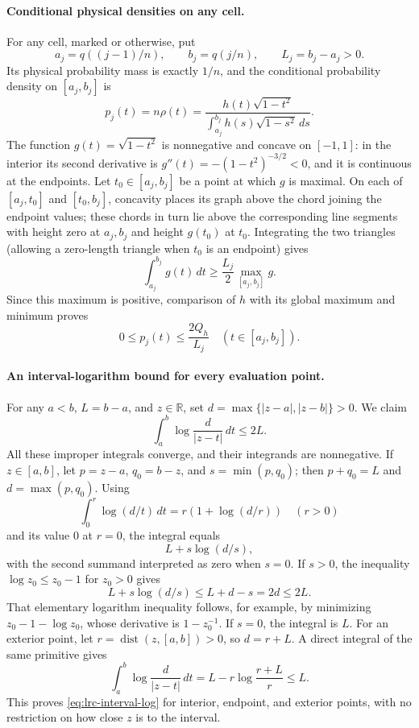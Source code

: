 \documentclass[11pt,a4paper]{article}
\begin{document}
\paragraph{Conditional physical densities on any cell.}
For any cell, marked or otherwise, put
\[
 a_j=q((j-1)/n),\qquad b_j=q(j/n),\qquad L_j=b_j-a_j>0.
\]
Its physical probability mass is exactly $1/n$, and the conditional
probability density on $[a_j,b_j]$ is
\[
 p_j(t)=n\rho(t)
       =\frac{h(t)\sqrt{1-t^2}}
               {\int_{a_j}^{b_j}h(s)\sqrt{1-s^2}\,ds}.
\]
The function $g(t)=\sqrt{1-t^2}$ is nonnegative and concave on
$[-1,1]$: in the interior its second derivative is
$g''(t)=-(1-t^2)^{-3/2}<0$, and it is continuous at the endpoints.
Let $t_0\in[a_j,b_j]$ be a point at which $g$ is maximal.
On each of $[a_j,t_0]$ and $[t_0,b_j]$, concavity places its graph
above the chord joining the endpoint values; these chords in turn
lie above the corresponding line segments with height zero at
$a_j,b_j$ and height $g(t_0)$ at $t_0$. Integrating the two triangles
(allowing a zero-length triangle when $t_0$ is an endpoint) gives
\[
 \int_{a_j}^{b_j}g(t)\,dt\geq\frac{L_j}2\max_{[a_j,b_j]}g.
\]
Since this maximum is positive, comparison of $h$ with its global
maximum and minimum proves
\begin{equation}\label{eq:lrc-cell-density}
 0\leq p_j(t)\leq\frac{2Q_h}{L_j}
 \quad(t\in[a_j,b_j]).
\end{equation}

\paragraph{An interval-logarithm bound for every evaluation point.}
For any $a<b$, $L=b-a$, and $z\in\mathbb R$, set
$d=\max\{|z-a|,|z-b|\}>0$. We claim
\begin{equation}\label{eq:lrc-interval-log}
 \int_a^b\log\frac d{|z-t|}\,dt\leq2L.
\end{equation}
All these improper integrals converge, and their integrands are
nonnegative. If $z\in[a,b]$, let $p=z-a$, $q_0=b-z$, and
$s=\min(p,q_0)$; then $p+q_0=L$ and $d=\max(p,q_0)$.
Using
\[
 \int_0^r\log(d/t)\,dt=r(1+\log(d/r))\quad(r>0)
\]
and its value $0$ at $r=0$, the integral equals
\[
 L+s\log(d/s),
\]
with the second summand interpreted as zero when $s=0$.
If $s>0$, the inequality $\log z_0\leq z_0-1$ for $z_0>0$ gives
\[
 L+s\log(d/s)\leq L+d-s=2d\leq2L.
\]
That elementary logarithm inequality follows, for example, by
minimizing $z_0-1-\log z_0$, whose derivative is $1-z_0^{-1}$.
If $s=0$, the integral is $L$. For an exterior point, let
$r=\operatorname{dist}(z,[a,b])>0$, so $d=r+L$. A direct integral
of the same primitive gives
\[
 \int_a^b\log\frac d{|z-t|}\,dt
 =L-r\log\frac{r+L}{r}\leq L.
\]
This proves \eqref{eq:lrc-interval-log} for interior, endpoint, and
exterior points, with no restriction on how close $z$ is to the
interval.
\end{document}
